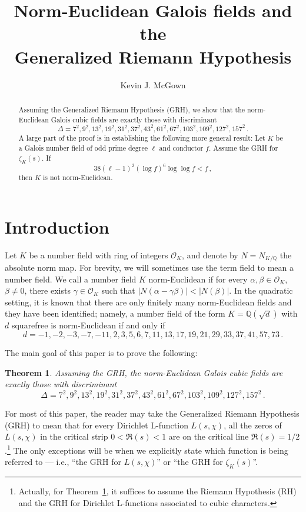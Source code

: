 \documentclass{amsart}
\author{Kevin J. McGown}
\date{}
\title[Norm-Euclidean Galois fields and the GRH]{Norm-Euclidean Galois fields and the\\ Generalized Riemann Hypothesis}
\newtheorem{theorem}{Theorem}[section]
\numberwithin{equation}{section}
\numberwithin{table}{section}
\begin{document}
\begin{abstract}
Assuming the Generalized Riemann Hypothesis (GRH), 
we show that
the norm-Euclidean Galois cubic fields
are exactly those with discriminant
$$
    \Delta=7^2,9^2,13^2,19^2,31^2,37^2,43^2,61^2,67^2,103^2,109^2,127^2,157^2
    \,.
$$  
A large part of the proof is in establishing the following
more general result:
Let $K$ be a Galois number field of odd prime degree $\ell$ and conductor $f$.  Assume the GRH for $\zeta_K(s)$.
If
$$
  38(\ell-1)^2(\log f)^6\log\log f<f
  \,,
$$  
then $K$ is not norm-Euclidean.
\end{abstract}

\maketitle

\vspace{-0.25in}

\section{Introduction}\label{S:intro}
Let $K$ be a number field with ring of integers ${\mathcal{O}_K}$, and denote by $N=N_{K/{\mathbb{Q}}}$ the
absolute norm map.  For brevity, we will sometimes use the term field to mean a number field.
We call a number field $K$ norm-Euclidean if for every $\alpha,\beta\in{\mathcal{O}_K}$, $\beta\neq 0$, there exists
$\gamma\in{\mathcal{O}_K}$ such that $|N(\alpha-\gamma\beta)|<|N(\beta)|$.
In the quadratic setting, it is known that there are only finitely many norm-Euclidean fields and they have been identified;
namely, a number field of the form $K={\mathbb{Q}}(\sqrt{d})$ with $d$ squarefree is norm-Euclidean if and only if
$$
  d=-1,-2,-3,-7,-11,2, 3, 5, 6, 7, 11, 13, 17, 19, 21, 29, 33, 37, 41, 57, 73
  \,.
$$

The main goal of this paper is to prove the following:
\begin{theorem}\label{T:cubic.GRH}
Assuming the GRH,
the norm-Euclidean Galois cubic fields
are exactly those with discriminant
$$
    \Delta=7^2,9^2,13^2,19^2,31^2,37^2,43^2,61^2,67^2,103^2,109^2,127^2,157^2
    \,.
$$  
\end{theorem}
For most of this paper, the reader may take the Generalized Riemann Hypothesis (GRH) to mean that
for every Dirichlet L-function $L(s,\chi)$, all the zeros of $L(s,\chi)$ in the critical strip $0<\Re(s)<1$
are on the critical line $\Re(s)=1/2$.\footnote{Actually, for Theorem~\ref{T:cubic.GRH}, it suffices to assume the Riemann Hypothesis (RH) and the GRH
for Dirichlet L-functions associated to cubic characters.}
The only exceptions will be when we explicitly state which function is being referred to ---
i.e., ``the GRH for $L(s,\chi)$'' or ``the GRH for $\zeta_K(s)$''.
\end{document}
